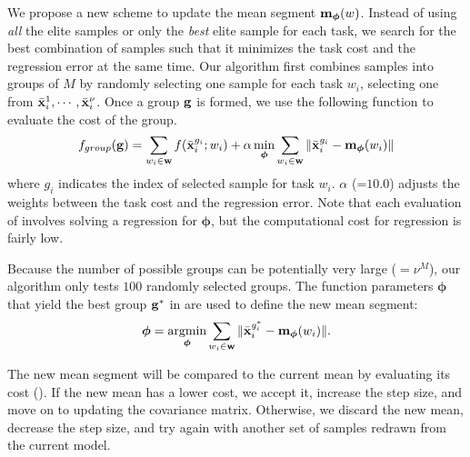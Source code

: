 We propose a new scheme to update the mean segment
$\mathbf{m}_{\boldsymbol{\phi}}(w)$. Instead of using \emph{all} the elite
samples or only the \emph{best} elite sample for each task, we search
for the best combination of samples such that it minimizes the task
cost and the regression error at the same
time. Our algorithm first combines samples into groups of $M$ by
randomly selecting one sample for each task $w_i$, \ie selecting one
from $\bar{\mathbf{x}}_i^1, \cdots, \bar{\mathbf{x}}_i^\nu$. Once a group
$\mathbf{g}$ is formed, we use the following function to evaluate the
cost of the group.
\begin{equation}
  f_{group}(\mathbf{g}) = \sum_{w_i \in \mathbf{w}} f(\bar{\mathbf{x}}^{g_i}_i; w_i)
  + \alpha \min_{\boldsymbol{\phi}} \sum_{w_i \in \mathbf{w}} \| \bar{\mathbf{x}}^{g_i}_i -
  \mathbf{m}_{\boldsymbol{\phi}} (w_i) \|
  \label{eq:optskills_group_eval}
\end{equation}  
where $g_i$ indicates the index of selected sample for task
$w_i$. $\alpha$ (=$10.0$) adjusts the weights between the task cost
and the 
regression error. Note that each evaluation of 
involves solving a regression for $\boldsymbol{\phi}$, but the
computational cost for regression is fairly low.

Because the number of possible groups can be potentially very large
($=\nu^M$), our algorithm only tests $100$ randomly selected groups. The function parameters
$\boldsymbol{\phi}$ that yield the best group $\mathbf{g}^*$ in
 are used to define the new mean segment:
\begin{equation}
  \boldsymbol{\phi} = \argmin_{\boldsymbol{\phi}} \sum_{w_i \in \vc{w}} \| \bar{\vc{x}}_i^{g^*_i} -
  \vc{m}_{\boldsymbol{\phi}} (w_i) \|.
  \label{eq:optskills_regression2}
\end{equation}  

The new mean segment will be compared to the
current mean by evaluating its cost ().
If the new mean has a lower cost, we accept it, increase the step
size, and move on to updating the covariance matrix. Otherwise, we
discard the new mean, decrease the step size, and try again with
another set of samples redrawn from the current model.

